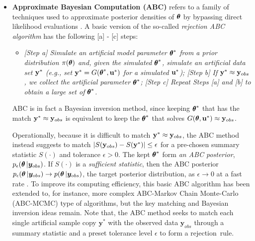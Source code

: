 \documentclass[12pt]{article}
\theoremstyle{shortspace}
\def\*#1{\bm{#1}}
\def\btheta{\mathop{\theta\kern-.45em\hbox{$\theta$}}\nolimits}
\begin{document}
\begin{itemize}
[leftmargin=1.5em, labelsep=0em, 
align=parleft,   itemsep=0pt,
  parsep=0pt,
  topsep=1pt]    \item 
{\bf  Approximate Bayesian Computation (ABC)}
refers to a family of techniques used to approximate posterior densities of $\btheta$ by bypassing direct likelihood evaluations \citep[cf.][]{Rubin1984,Tavare1997, csillery2010approximate, 
Peters2012}.  
A basic version of the so-called {\it rejection ABC algorithm} has the following [a] - [c] steps:
\begin{itemize}
[leftmargin=1.5em, labelsep=0em, 
align=parleft,   itemsep=0pt,
  parsep=0pt,
  topsep=1pt] 
\item[] {\it 
   {\rm [Step a]} Simulate an artificial model parameter $\btheta^*$ from a prior distribution $\pi(\btheta)$ and, given the simulated $\btheta^*$, simulate an artificial data set ${\bf y}^*$ 
(e.g., set ${\bf y}^* = G(\btheta^*, {\bf u}^*)$ for a simulated ${\bf u}^*$); 
{\rm [Step b]} If 
$ {\bf y}^* \approx {\bf y}_{obs}$,
 we collect the artificial parameter $\btheta^*$; 
 {\rm [Step c]} Repeat Steps [a] and [b] to obtain a large set of $\btheta^*$.}
 \end{itemize}
ABC is in fact 
a Bayesian inversion method,
since keeping $\btheta^*$ that has the match ${\bf y}^* \approx {\bf y}_{obs}$ is equivalent to keep the $\btheta^*$ that solves $G(\btheta, {\bf u}^*) \approx {\bf y}_{obs}$.

Operationally,
because it is difficult to match ${\bf y}^* \approx {\bf y}_{obs}$, the ABC method instead suggests to match
$|S({\bf y}_{obs}) - S({\bf y}^*)|\leq \epsilon$ for a pre-chosen summary statistic $S(\cdot)$ and tolerance $\epsilon >0$. The kept $\btheta^*$ form  
{\it an ABC posterior},  $p_{\epsilon}(\btheta|\*y_{obs})$.  
If $S(\cdot)$
is a {\it sufficient statistic},  then the ABC posterior $p_{\epsilon}(\btheta | \*y_{obs}) \to p(\btheta | \*y_{obs})$,  
the target posterior distribution,  as $\epsilon \to 0$ at a fast rate \citep{Barber2015,Li2016}.
To improve its computing efficiency, this basic ABC algorithm has been extended to, for instance, more complex ABC-Markov Chain Monte-Carlo (ABC-MCMC) type of algorithms, but the key matching and Bayesian inversion ideas remain. 
Note that, the ABC method seeks to match each single artificial sample copy $\*y^*$ with the observed data $\*y_{obs}$ through a summary statistic and a preset tolerance level $\epsilon$ to form a rejection~rule. 


\end{itemize}
\end{document}
